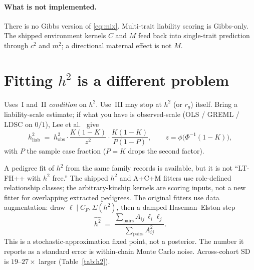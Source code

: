 \documentclass[11pt,a4paper]{article}
\newcommand{\h}{h^{2}}
\begin{document}
\paragraph{What is not implemented.}
There is no Gibbs version of \eqref{eq:mix}.
Multi-trait liability scoring is Gibbs-only.
The shipped environment kernels $C$ and $M$ feed back into
single-trait prediction through $c^{2}$ and $m^{2}$; a directional
maternal effect is not $M$.

\section{Fitting \(\h\) is a different problem}
\label{sec:fitting}

Uses~I and~II \emph{condition} on $\h$.
Use~III may stop at $\h$ (or $r_g$) itself.
Bring a liability-scale estimate; if what you have is observed-scale
(OLS / GREML / LDSC on $0/1$), Lee et al.\ \cite{lee2011} give
\begin{equation}
  \h_{\mathrm{liab}}
  \;=\;
  \h_{\mathrm{obs}}
  \cdot
  \frac{K(1-K)}{z^{2}}
  \cdot
  \frac{K(1-K)}{P(1-P)},
  \qquad
  z=\phi\bigl(\Phi^{-1}(1-K)\bigr),
  \label{eq:lee}
\end{equation}
with $P$ the sample case fraction ($P=K$ drops the second factor).

A pedigree fit of $\h$ from the same family records is available,
but it is not ``LT-FH++ with $\h$ free.''
The shipped $\h$ and A+C+M fitters use role-defined relationship classes;
the arbitrary-kinship kernels are scoring inputs, not a new fitter for
overlapping extracted pedigrees.
The original fitters use data augmentation: draw
$\ell\mid C_F,\Sigma(\h)$, then a damped Haseman--Elston step
\begin{equation}
  \widehat{\h}
  \;=\;
  \frac{\sum_{\mathrm{pairs}} A_{ij}\,\ell_i\ell_j}
       {\sum_{\mathrm{pairs}} A_{ij}^{2}}.
  \label{eq:he}
\end{equation}
This is a stochastic-approximation fixed point, not a posterior.
The number it reports as a standard error is within-chain Monte
Carlo noise.
Across-cohort SD is $19$--$27\times$ larger
(Table~\ref{tab:h2}).
\end{document}
